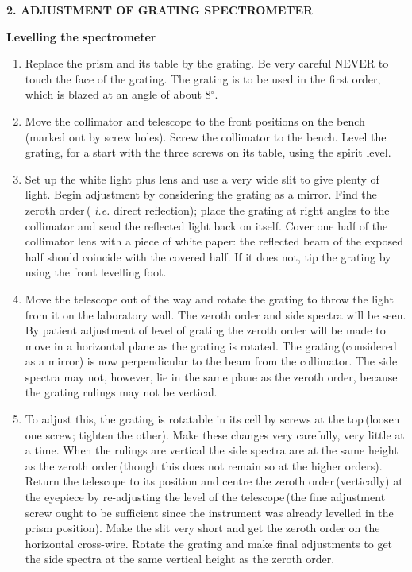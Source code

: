 \documentclass[12pt]{article}
\newcommand{\ie}{ {\em i.e. }}
\begin{document}
\newpage

{\bf 2. ADJUSTMENT OF GRATING SPECTROMETER}

{\bf Levelling the spectrometer}

\begin{enumerate}

\item Replace the prism and its table by the grating. Be very careful NEVER to touch the face of the grating. The grating is to be used in the first order, which is blazed at an angle of about 8$^\circ$.

\item Move the collimator and telescope to the front positions on the bench\,(marked out  by screw holes). Screw the collimator to the bench. Level the grating, for a start with the three screws on its table, using the spirit level.

\item Set up the white light plus lens and use a very wide slit to give plenty of light. Begin  adjustment by considering the grating as a mirror. Find the zeroth order\,(\ie direct reflection); place the grating at right angles to the collimator and send the reflected light back on itself. Cover one half of the collimator lens with a piece of white paper: the reflected beam of the exposed half should coincide with the covered half. If it does not, tip the grating by using the front levelling foot.

\item Move the telescope out of the way and rotate the grating to throw the light from it on the laboratory wall. The zeroth order and side spectra will be seen. By patient adjustment of level of grating the zeroth order will be made to move in a horizontal plane as the grating is rotated. The grating\,(considered as a mirror) is now perpendicular to the beam from the collimator. The side spectra may not, however, lie in the same plane as the zeroth order, because the grating rulings may not be vertical.

\item To adjust this, the grating is rotatable in its cell by screws at the top\,(loosen one  screw; tighten the other). Make these changes very carefully, very little at a time. When the rulings are vertical the side spectra are at the same height as the zeroth order\,(though this does not remain so at the higher orders). Return the telescope to its position and centre the zeroth order\,(vertically) at the eyepiece by re-adjusting the level of the telescope\,(the fine adjustment screw ought to be sufficient since the instrument was already levelled in the prism position). Make the slit very short and get the zeroth order on the horizontal cross-wire. Rotate the grating and make final adjustments to get the side spectra at the same vertical height as the zeroth order.


\end{enumerate}
\end{document}

